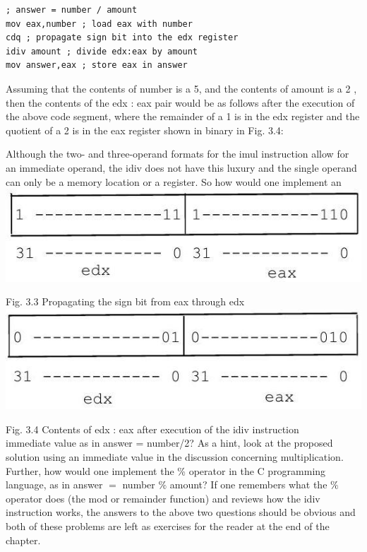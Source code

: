 \documentclass[10pt]{article}
\begin{document}
\begin{verbatim}
; answer = number / amount
mov eax,number ; load eax with number
cdq ; propagate sign bit into the edx register
idiv amount ; divide edx:eax by amount
mov answer,eax ; store eax in answer
\end{verbatim}

Assuming that the contents of number is a 5, and the contents of amount is a 2 , then the contents of the edx : eax pair would be as follows after the execution of the above code segment, where the remainder of a 1 is in the edx register and the quotient of a 2 is in the eax register shown in binary in Fig. 3.4:

Although the two- and three-operand formats for the imul instruction allow for an immediate operand, the idiv does not have this luxury and the single operand can only be a memory location or a register. So how would one implement an\\
\includegraphics[max width=\textwidth, center]{2025_03_24_ebe50cc223a6fbc49eecg-051}

Fig. 3.3 Propagating the sign bit from eax through edx\\
\includegraphics[max width=\textwidth, center]{2025_03_24_ebe50cc223a6fbc49eecg-052}

Fig. 3.4 Contents of edx : eax after execution of the idiv instruction\\
immediate value as in answer = number/2? As a hint, look at the proposed solution using an immediate value in the discussion concerning multiplication. Further, how would one implement the \% operator in the C programming language, as in answer $=$ number $\%$ amount? If one remembers what the $\%$ operator does (the mod or remainder function) and reviews how the idiv instruction works, the answers to the above two questions should be obvious and both of these problems are left as exercises for the reader at the end of the chapter.
\end{document}
